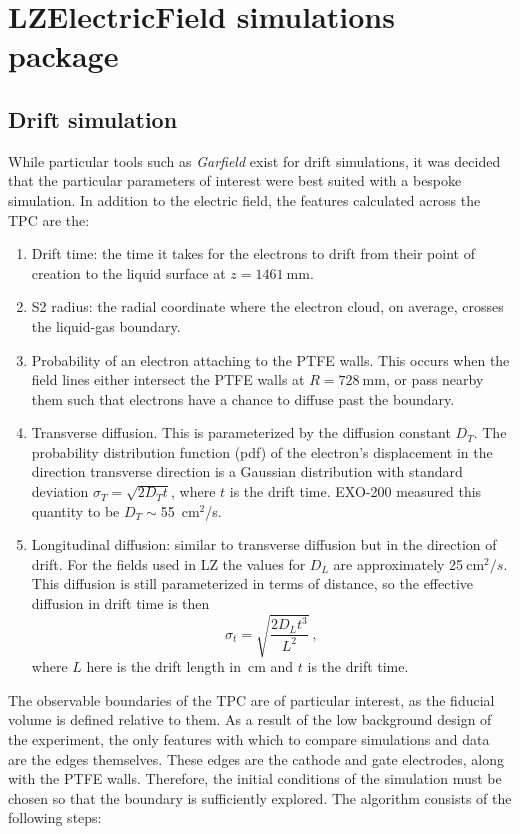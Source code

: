 \section{LZElectricField simulations package}
\subsection{Drift simulation}
While particular tools such as \textit{Garfield} exist for drift simulations, it was decided that the particular parameters of interest were best suited with a bespoke simulation.
In addition to the electric field, the features calculated across the TPC are the:
\begin{enumerate}
    \item Drift time: the time it takes for the electrons to drift from their point of creation to the liquid surface at $z=1461\mathrm{~mm}$.
    \item S2 radius: the radial coordinate where the electron cloud, on average, crosses the liquid-gas boundary.
    \item Probability of an electron attaching to the PTFE walls. This occurs when the field lines either intersect the PTFE walls at $R=728\mathrm{~mm}$, or pass nearby them such that electrons have a chance to diffuse past the boundary. 
    \item Transverse diffusion. This is parameterized by the diffusion constant $D_T$. The probability distribution function (pdf) of the electron's displacement in the direction transverse direction is a Gaussian distribution with standard deviation $\sigma_T = \sqrt{2 D_T t}$, where $t$ is the drift time\cite{mcdonald_electron_2019}.
    EXO-200 measured this quantity to be $D_T\sim$55~cm$^2$/s\cite{collaboration_measurement_2017}.
    \item Longitudinal diffusion: similar to transverse diffusion but in the direction of drift. 
    For the fields used in LZ the values for $D_L$ are approximately 25$\mathrm{~cm}^2/s$\cite{njoya_measurements_2020}. 
    This diffusion is still parameterized in terms of distance, so the effective diffusion in drift time is then
    \begin{equation}
        \sigma_t = \sqrt{\frac{2D_L t^3 }{ L^2} }~,
    \end{equation}
    \noindent
    where $L$ here is the drift length in~cm and $t$ is the drift time.
\end{enumerate}

The observable boundaries of the TPC are of particular interest, as the fiducial volume is defined relative to them.
As a result of the low background design of the experiment, the only features with which to compare simulations and data are the edges themselves.
These edges are the cathode and gate electrodes, along with the PTFE walls.
Therefore, the initial conditions of the simulation must be chosen so that the boundary is sufficiently explored.
The algorithm consists of the following steps:

